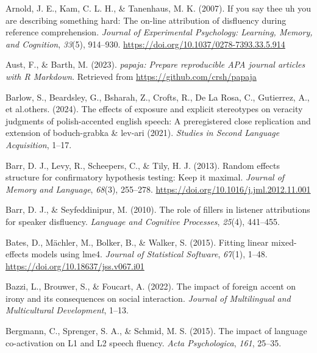 \documentclass[
  man,floatsintext]{apa7}
\newlength{\cslhangindent}
\newlength{\cslentryspacingunit} %
\newenvironment{CSLReferences}[2] %
 {%
  \setlength{\parindent}{0pt}
  \ifodd #1
  \let\oldpar\par
  \def\par{\hangindent=\cslhangindent\oldpar}
  \fi
  \setlength{\parskip}{#2\cslentryspacingunit}
 }%
 {}
\begin{document}
\hypertarget{refs}{}
\begin{CSLReferences}{1}{0}
\leavevmode{}%
Arnold, J. E., Kam, C. L. H., \& Tanenhaus, M. K. (2007). If you say thee uh you are describing something hard: The on-line attribution of disfluency during reference comprehension. \emph{Journal of Experimental Psychology: Learning, Memory, and Cognition}, \emph{33}(5), 914--930. \url{https://doi.org/10.1037/0278-7393.33.5.914}

\leavevmode{}%
Aust, F., \& Barth, M. (2023). \emph{{papaja}: {Prepare} reproducible {APA} journal articles with {R Markdown}}. Retrieved from \url{https://github.com/crsh/papaja}

\leavevmode{}%
Barlow, S., Beardsley, G., Bsharah, Z., Crofts, R., De La Rosa, C., Gutierrez, A., et al.others. (2024). The effects of exposure and explicit stereotypes on veracity judgments of polish-accented english speech: A preregistered close replication and extension of boduch-grabka \& lev-ari (2021). \emph{Studies in Second Language Acquisition}, 1--17.

\leavevmode{}%
Barr, D. J., Levy, R., Scheepers, C., \& Tily, H. J. (2013). Random effects structure for confirmatory hypothesis testing: Keep it maximal. \emph{Journal of Memory and Language}, \emph{68}(3), 255--278. \url{https://doi.org/10.1016/j.jml.2012.11.001}

\leavevmode{}%
Barr, D. J., \& Seyfeddinipur, M. (2010). The role of fillers in listener attributions for speaker disfluency. \emph{Language and Cognitive Processes}, \emph{25}(4), 441--455.

\leavevmode{}%
Bates, D., Mächler, M., Bolker, B., \& Walker, S. (2015). Fitting linear mixed-effects models using {lme4}. \emph{Journal of Statistical Software}, \emph{67}(1), 1--48. \url{https://doi.org/10.18637/jss.v067.i01}

\leavevmode{}%
Bazzi, L., Brouwer, S., \& Foucart, A. (2022). The impact of foreign accent on irony and its consequences on social interaction. \emph{Journal of Multilingual and Multicultural Development}, 1--13.

\leavevmode{}%
Bergmann, C., Sprenger, S. A., \& Schmid, M. S. (2015). The impact of language co-activation on {L1} and {L2} speech fluency. \emph{Acta {Psychologica}}, \emph{161}, 25--35.


\end{CSLReferences}
\end{document}
